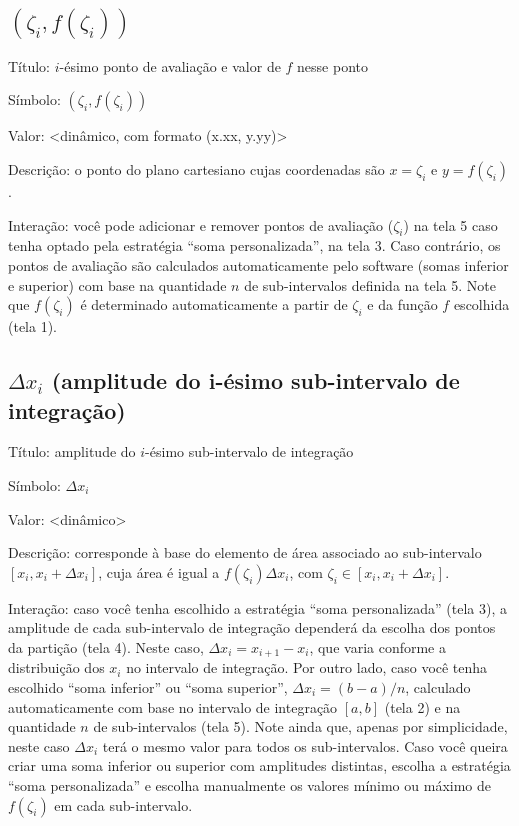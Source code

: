 \documentclass[a4paper,10pt]{scrartcl}
\newcommand\subintervalo{\ensuremath{[x_i, x_i + \Delta x_i]}}
\begin{document}
    \newpage
    
  \subsection*{$(\zeta_i,f(\zeta_i))$}
    \begin{compactdesc}
      \item{Título:} $i$-ésimo ponto de avaliação e valor de $f$ nesse ponto
      \item{Símbolo:} $(\zeta_i,f(\zeta_i))$
      \item{Valor:} <dinâmico, com formato (x.xx, y.yy)>
      \item{Descrição:} o ponto do plano cartesiano cujas coordenadas são $x = \zeta_i$ e $y = f(\zeta_i)$.
      \item{Interação:} você pode adicionar e remover pontos de avaliação ($\zeta_i$) na tela 5 caso tenha optado pela estratégia ``soma personalizada'', na tela 3. Caso contrário, os pontos de avaliação são calculados automaticamente pelo software (somas inferior e superior) com base na quantidade $n$ de sub-intervalos definida na tela 5. Note que $f(\zeta_i)$ é determinado automaticamente a partir de $\zeta_i$ e da função $f$ escolhida (tela 1).
    \end{compactdesc}

  \subsection*{$\Delta x_i$ (amplitude do i-ésimo sub-intervalo de integração)}
    \begin{compactdesc}
      \item{Título:} amplitude do $i$-ésimo sub-intervalo de integração
      \item{Símbolo:} $\Delta x_i$
      \item{Valor:} <dinâmico>
      \item{Descrição:} corresponde à base do elemento de área associado ao sub-intervalo \subintervalo, cuja área é igual a $f(\zeta_i)\Delta x_i$, com $\zeta_i \in \subintervalo$.
      \item{Interação:} caso você tenha escolhido a estratégia ``soma personalizada'' (tela 3), a amplitude de cada sub-intervalo de integração dependerá da escolha dos pontos da partição (tela 4). Neste caso, $\Delta x_i = x_{i+1} - x_i$, que varia conforme a distribuição dos $x_i$ no intervalo de integração. Por outro lado, caso você tenha escolhido ``soma inferior'' ou ``soma superior'', $\Delta x_i = (b - a)/n$, calculado automaticamente com base no intervalo de integração $[a,b]$ (tela 2) e na quantidade $n$ de sub-intervalos (tela 5). Note ainda que, apenas por simplicidade, neste caso $\Delta x_i$ terá o mesmo valor para todos os sub-intervalos. Caso você queira criar uma soma inferior ou superior com amplitudes distintas, escolha a estratégia ``soma personalizada'' e escolha manualmente os valores mínimo ou máximo de $f(\zeta_i)$ em cada sub-intervalo.
    \end{compactdesc}
   
\end{document}
